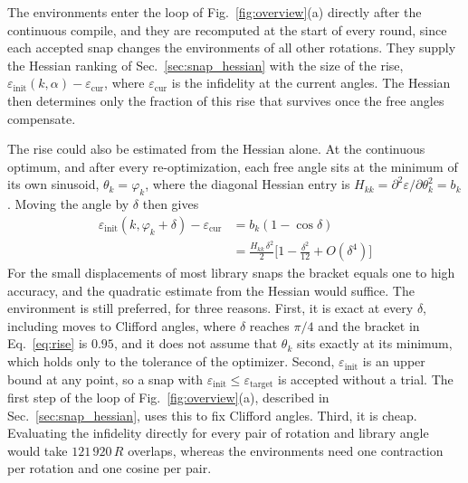 The environments enter the loop of Fig.~\ref{fig:overview}(a) directly after the continuous compile, and they are recomputed at the start of every round, since each accepted snap changes the environments of all other rotations. They supply the Hessian ranking of Sec.~\ref{sec:snap_hessian} with the size of the rise, $\varepsilon_{\mathrm{init}}(k, \alpha) - \varepsilon_{\mathrm{cur}}$, where $\varepsilon_{\mathrm{cur}}$ is the infidelity at the current angles. The Hessian then determines only the fraction of this rise that survives once the free angles compensate.

The rise could also be estimated from the Hessian alone. At the continuous optimum, and after every re-optimization, each free angle sits at the minimum of its own sinusoid, $\theta_k = \varphi_k$, where the diagonal Hessian entry is $H_{kk} = \partial^{2}\varepsilon/\partial\theta_k^{2} = b_k$. Moving the angle by $\delta$ then gives
\begin{equation}
\begin{split}
\varepsilon_{\mathrm{init}}(k, \varphi_k + \delta) - \varepsilon_{\mathrm{cur}} &= b_k (1 - \cos\delta) \\
&= \frac{H_{kk}\,\delta^{2}}{2} \Big[ 1 - \frac{\delta^{2}}{12} + O(\delta^{4}) \Big]
\end{split}
\label{eq:rise}
\end{equation}
For the small displacements of most library snaps the bracket equals one to high accuracy, and the quadratic estimate from the Hessian would suffice. The environment is still preferred, for three reasons. First, it is exact at every $\delta$, including moves to Clifford angles, where $\delta$ reaches $\pi/4$ and the bracket in Eq.~\eqref{eq:rise} is $0.95$, and it does not assume that $\theta_k$ sits exactly at its minimum, which holds only to the tolerance of the optimizer. Second, $\varepsilon_{\mathrm{init}}$ is an upper bound at any point, so a snap with $\varepsilon_{\mathrm{init}} \leq \varepsilon_{\mathrm{target}}$ is accepted without a trial. The first step of the loop of Fig.~\ref{fig:overview}(a), described in Sec.~\ref{sec:snap_hessian}, uses this to fix Clifford angles. Third, it is cheap. Evaluating the infidelity directly for every pair of rotation and library angle would take $121\,920\,R$ overlaps, whereas the environments need one contraction per rotation and one cosine per pair.

